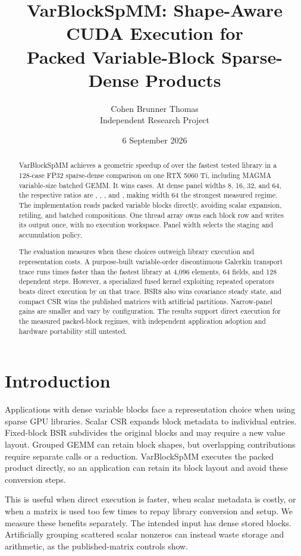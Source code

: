 \documentclass[10pt]{article}
\title{VarBlockSpMM: Shape-Aware CUDA Execution for\\Packed Variable-Block Sparse-Dense Products}
\author{Cohen Brunner Thomas\\\small Independent Research Project}
\date{6 September 2026}
\begin{document}
\maketitle

\begin{abstract}
VarBlockSpMM achieves a geometric speedup of \RelevanceCoreRatio{} over the
fastest tested library in a 128-case FP32 sparse-dense comparison on one
RTX 5060 Ti, including MAGMA variable-size batched GEMM. It wins
\RelevanceCoreWins{} cases. At dense panel widths 8, 16, 32, and 64, the
respective ratios are \RelevanceRhsEight{}, \RelevanceRhsSixteen{},
\RelevanceRhsThirtyTwo{}, and \RelevanceRhsSixtyFour{}, making width 64
the strongest measured regime.
The implementation reads packed variable blocks directly, avoiding scalar
expansion, retiling, and batched compositions. One thread array owns each
block row and writes its output once, with no execution workspace.
Panel width selects the staging and accumulation policy.

The evaluation measures when these choices outweigh library execution and
representation costs. A purpose-built variable-order discontinuous Galerkin
transport trace runs \TransportLargeRatio{} times faster than the fastest
library at 4,096 elements, 64 fields, and 128 dependent steps. However, a
specialized fused kernel exploiting repeated operators beats direct execution
by \DgFusedLarge{} on that trace. BSR8 also wins covariance steady state,
and compact CSR wins the published matrices with artificial partitions.
Narrow-panel gains are smaller and vary by configuration. The results support
direct execution for the measured packed-block regimes, with independent
application adoption and hardware portability still untested.
\end{abstract}

\section{Introduction}
Applications with dense variable blocks face a representation choice when
using sparse GPU libraries. Scalar CSR expands block metadata to individual
entries. Fixed-block BSR subdivides the original blocks and may require a
new value layout. Grouped GEMM can retain block shapes, but overlapping
contributions require separate calls or a reduction. VarBlockSpMM executes
the packed product directly, so an application can retain its block layout
and avoid these conversion steps.

This is useful when direct execution is faster, when scalar metadata is
costly, or when a matrix is used too few times to repay library conversion
and setup. We measure these benefits separately. The intended input has
dense stored blocks. Artificially grouping scattered scalar nonzeros can
instead waste storage and arithmetic, as the published-matrix controls show.
\end{document}
